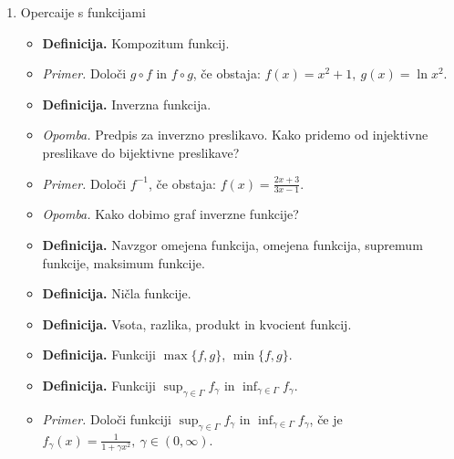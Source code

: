 \begin{enumerate}
    \item Opercaije s funkcijami
    \begin{itemize}
        \item \colorbox{purple!30}{\textbf{Definicija.}} Kompozitum funkcij.
        \item \colorbox{yellow!30}{\emph{Primer.}} Določi $g \circ f$ in $f \circ g$, če obstaja: $f(x) = x^2 + 1, \ g(x) = \ln x^2$.
        \item \colorbox{purple!30}{\textbf{Definicija.}} Inverzna funkcija.
        \item \colorbox{yellow!30}{\emph{Opomba.}} Predpis za inverzno preslikavo. Kako pridemo od injektivne preslikave do bijektivne preslikave?
        \item \colorbox{yellow!30}{\emph{Primer.}} Določi $f^{-1}$, če obstaja: $f(x) = \frac{2x+3}{3x-1}$.
        \item \colorbox{yellow!30}{\emph{Opomba.}} Kako dobimo graf inverzne funkcije?
        \item \colorbox{purple!30}{\textbf{Definicija.}} Navzgor omejena funkcija, omejena funkcija, supremum funkcije, maksimum funkcije.
        \item \colorbox{purple!30}{\textbf{Definicija.}} Ničla funkcije.
        \item \colorbox{purple!30}{\textbf{Definicija.}} Vsota, razlika, produkt in kvocient funkcij.
        \item \colorbox{purple!30}{\textbf{Definicija.}} Funkciji $\max \{ f,g \}$, $\min \{ f,g \}$.
        \item \colorbox{purple!30}{\textbf{Definicija.}} Funkciji $\displaystyle \sup_{\gamma \in \Gamma} f_\gamma$ in $\displaystyle \inf_{\gamma \in \Gamma} f_\gamma$.
        \item \colorbox{yellow!30}{\emph{Primer.}} Določi funkciji $\displaystyle \sup_{\gamma \in \Gamma} f_\gamma$ in $\displaystyle \inf_{\gamma \in \Gamma} f_\gamma$, če je $\displaystyle f_\gamma(x) = \frac{1}{1+\gamma x^2}, \ \gamma \in (0, \infty)$.
    \end{itemize}
\end{enumerate}